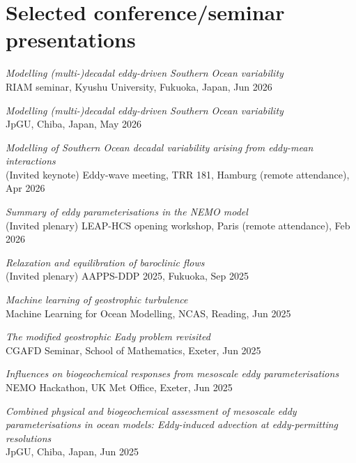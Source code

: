 \documentclass[letterpaper]{article}
\renewenvironment{itemize}{
  \begin{list}{}{
    \setlength{\leftmargin}{1.5em}
  }
}{
  \end{list}
}
\begin{document}
\section*{Selected conference/seminar presentations}
\begin{itemize}

\item[--] \textit{Modelling (multi-)decadal eddy-driven Southern Ocean variability}\\
RIAM seminar, Kyushu University, Fukuoka, Japan, Jun 2026

\item[--] \textit{Modelling (multi-)decadal eddy-driven Southern Ocean variability}\\
JpGU, Chiba, Japan, May 2026

\item[--] \textit{Modelling of Southern Ocean decadal variability arising from eddy-mean interactions}\\
(Invited keynote) Eddy-wave meeting, TRR 181, Hamburg (remote attendance), Apr 2026

\item[--] \textit{Summary of eddy parameterisations in the NEMO model}\\
(Invited plenary) LEAP-HCS opening workshop, Paris (remote attendance), Feb 2026

\item[--] \textit{Relaxation and equilibration of baroclinic flows}\\
(Invited plenary) AAPPS-DDP 2025, Fukuoka, Sep 2025

\item[--] \textit{Machine learning of geostrophic turbulence}\\
Machine Learning for Ocean Modelling, NCAS, Reading, Jun 2025

\item[--] \textit{The modified geostrophic Eady problem revisited}\\
CGAFD Seminar, School of Mathematics, Exeter, Jun 2025

\item[--] \textit{Influences on biogeochemical responses from mesoscale eddy parameterisations}\\
NEMO Hackathon, UK Met Office, Exeter, Jun 2025

\item[--] \textit{Combined physical and biogeochemical assessment of mesoscale eddy parameterisations in ocean models: Eddy-induced advection at eddy-permitting resolutions}\\
JpGU, Chiba, Japan, Jun 2025

\end{itemize}
\end{document}
